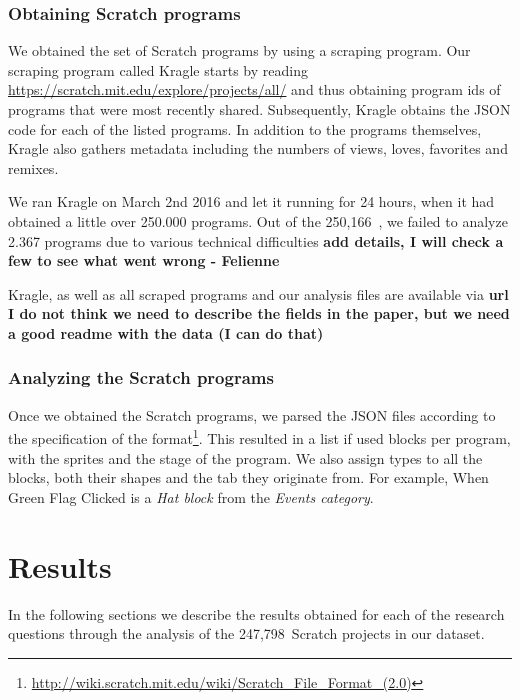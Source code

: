 \documentclass{sig-alternate}
\newcommand{\nPrograms}{250,166}
\newcommand{\nAnalyzedPrograms}{247,798}
\newcommand{\todo}[1]{\textbf{#1}}
\begin{document}
\subsubsection{Obtaining Scratch programs}
We obtained the set of Scratch programs by using a scraping program. Our scraping program called Kragle starts by reading \url{https://scratch.mit.edu/explore/projects/all/} and thus obtaining program ids of programs that were most recently shared. Subsequently, Kragle obtains the JSON code for each of the listed programs. In addition to the programs themselves, Kragle also gathers metadata including the numbers of views, loves, favorites and remixes.


We ran Kragle on March 2nd 2016 and let it running for 24 hours, when it had obtained a little over 250.000 programs.  Out of the \nPrograms~, we failed to analyze 2.367 programs due to various technical difficulties \todo{add details, I will check a few to see what went wrong - Felienne} 

Kragle, as well as all scraped programs and our analysis files are available via \todo{url} \todo{I do not think we need to describe the fields in the paper, but we need a good readme with the data (I can do that)}

\subsubsection{Analyzing the Scratch programs}
Once we obtained the Scratch programs, we parsed the JSON files according to the specification of the format\footnote{\url{http://wiki.scratch.mit.edu/wiki/Scratch_File_Format_(2.0)}}. This resulted in a list if used blocks per program, with the sprites and the stage of the program. We also assign types to all the blocks, both their shapes and the tab they originate from. For example, When Green Flag Clicked is a \emph{Hat block} from the \emph{Events category}.


\section{Results}

In the following sections we describe the results obtained for each of the research questions through the analysis of the \nAnalyzedPrograms~Scratch projects in our dataset.
\end{document}

